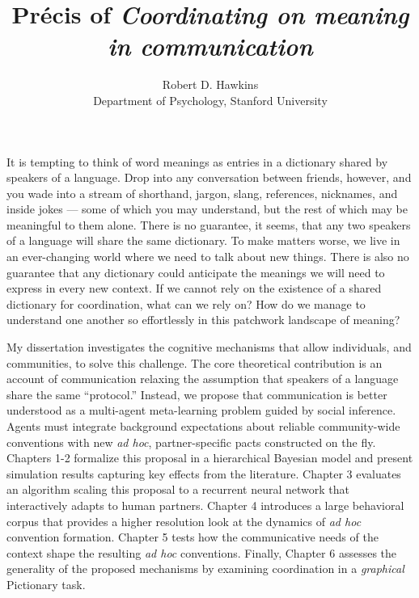 \documentclass[11pt]{article}
\title{Pr\'ecis of \emph{Coordinating on meaning in communication} }
\author{Robert D. Hawkins \\ \small Department of Psychology, Stanford University}
\date{}
\begin{document}

\maketitle

It is tempting to think of word meanings as entries in a dictionary shared by speakers of a language. 
Drop into any conversation between friends, however, and you wade into a stream of shorthand, jargon, slang, references, nicknames, and inside jokes --- some of which you may understand, but the rest of which may be meaningful to them alone. 
There is no guarantee, it seems, that any two speakers of a language will share the same dictionary.
To make matters worse, we live in an ever-changing world where we need to talk about new things.
There is also no guarantee that any dictionary could anticipate the meanings we will need to express in every new context.
If we cannot rely on the existence of a shared dictionary for coordination, what can we rely on?
How do we manage to understand one another so effortlessly in this patchwork landscape of meaning?

My dissertation investigates the cognitive mechanisms that allow individuals, and communities, to solve this challenge.
The core theoretical contribution is an account of communication relaxing the assumption that speakers of a language share the same ``protocol.''
Instead, we propose that communication is better understood as a multi-agent meta-learning problem guided by social inference.
Agents must integrate background expectations about reliable community-wide conventions with new \emph{ad hoc}, partner-specific pacts constructed on the fly.
Chapters 1-2 formalize this proposal in a hierarchical Bayesian model and present simulation results capturing key effects from the literature. 
Chapter 3 evaluates an algorithm scaling this proposal to a recurrent neural network that interactively adapts to human partners.
Chapter 4 introduces a large behavioral corpus that provides a higher resolution look at the dynamics of \emph{ad hoc} convention formation. %
Chapter 5 tests how the communicative needs of the context shape the resulting \emph{ad hoc} conventions. 
Finally, Chapter 6 assesses the generality of the proposed mechanisms by examining coordination in a \emph{graphical} Pictionary task. 
\end{document}
